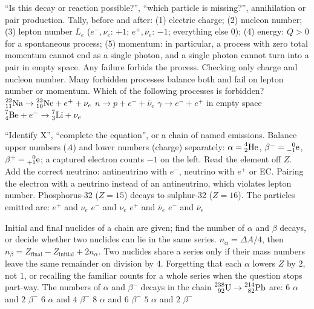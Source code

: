 {``Is this decay or reaction possible?'', ``which particle is missing?'', annihilation or pair
production.}
{Tally, before and after: (1) electric charge; (2) nucleon number; (3) lepton number $L_e$ ($e^-,\nu_e$: $+1$;
$e^+,\bar\nu_e$: $-1$; everything else $0$); (4) energy: $Q>0$ for a spontaneous process; (5) momentum:
in particular, a process with zero total momentum cannot end as a single photon, and a single photon
cannot turn into a pair in empty space. Any failure forbids the process.}
{Checking only charge and nucleon number. Many forbidden processes balance both and fail on lepton number
or momentum.}
{Which of the following processes is forbidden?}
{$\prescript{22}{11}{\mathrm{Na}}\to\prescript{22}{10}{\mathrm{Ne}}+e^++\nu_e$}
{$n\to p+e^-+\bar\nu_e$}
{$\gamma\to e^-+e^+$ in empty space}
{$\prescript{7}{4}{\mathrm{Be}}+e^-\to\prescript{7}{3}{\mathrm{Li}}+\nu_e$}

{``Identify X'', ``complete the equation'', or a chain of named emissions.}
{Balance upper numbers ($A$) and lower numbers (charge) separately: $\alpha=\prescript{4}{2}{\mathrm{He}}$,
$\beta^-=\prescript{0}{-1}{\mathrm{e}}$, $\beta^+=\prescript{0}{+1}{\mathrm{e}}$; a captured electron counts $-1$ on the left. Read the
element off $Z$. Add the correct neutrino: antineutrino with $e^-$, neutrino with $e^+$ or EC.}
{Pairing the electron with a neutrino instead of an antineutrino, which violates lepton number.}
{Phosphorus-32 ($Z=15$) decays to sulphur-32 ($Z=16$). The particles emitted are:}
{$e^+$ and $\nu_e$}
{$e^-$ and $\nu_e$}
{$e^+$ and $\bar\nu_e$}
{$e^-$ and $\bar\nu_e$}

{Initial and final nuclides of a chain are given; find the number of $\alpha$ and $\beta$ decays, or decide
whether two nuclides can lie in the same series.}
{$n_\alpha=\Delta A/4$, then $n_\beta=Z_{\text{final}}-Z_{\text{initial}}+2n_\alpha$. Two nuclides share a
series only if their mass numbers leave the same remainder on division by $4$.}
{Forgetting that each $\alpha$ lowers $Z$ by $2$, not $1$, or recalling the familiar counts for a whole
series when the question stops part-way.}
{The numbers of $\alpha$ and $\beta^-$ decays in the chain $\prescript{238}{92}{\mathrm{U}}\to\prescript{214}{82}{\mathrm{Pb}}$ are:}
{$6$ $\alpha$ and $2$ $\beta^-$}
{$6$ $\alpha$ and $4$ $\beta^-$}
{$8$ $\alpha$ and $6$ $\beta^-$}
{$5$ $\alpha$ and $2$ $\beta^-$}

